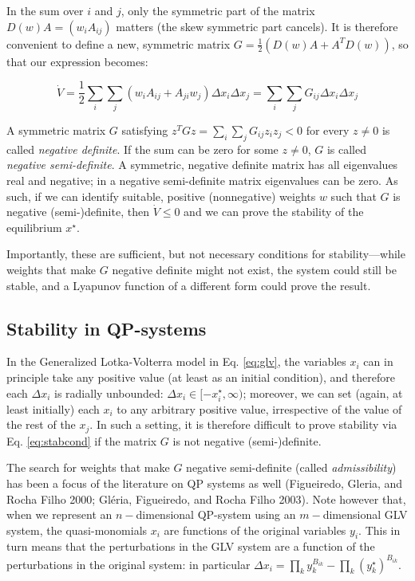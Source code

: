 \documentclass{article}
\begin{document}
In the sum over \(i\) and \(j\), only the symmetric part of the matrix
\(D(w) A = (w_i A_{ij})\) matters (the skew symmetric part cancels). It
is therefore convenient to define a new, symmetric matrix
\(G =\frac{1}{2} (D(w)A + A^T D(w))\), so that our expression becomes:

\begin{equation}
\label{eq:stabcond}
\dot{V} = \frac{1}{2}\sum_i \sum_j (w_i A_{ij} + A_{ji} w_j) \Delta x_i \Delta x_j = \sum_i \sum_j G_{ij} \Delta x_i \Delta x_j
\end{equation}

A symmetric matrix \(G\) satisfying
\(z^T G z = \sum_i \sum_j G_{ij} z_i z_j < 0\) for every \(z \neq 0\) is
called \emph{negative definite}. If the sum can be zero for some
\(z \neq 0\), \(G\) is called \emph{negative semi-definite}. A
symmetric, negative definite matrix has all eigenvalues real and
negative; in a negative semi-definite matrix eigenvalues can be zero. As
such, if we can identify suitable, positive (nonnegative) weights \(w\)
such that \(G\) is negative (semi-)definite, then \(\dot{V} \leq 0\) and
we can prove the stability of the equilibrium \(x^\star\).

Importantly, these are sufficient, but not necessary conditions for
stability---while weights that make \(G\) negative definite might not
exist, the system could still be stable, and a Lyapunov function of a
different form could prove the result.

\hypertarget{stability-in-qp-systems}{%
\subsection{Stability in QP-systems}\label{stability-in-qp-systems}}

In the Generalized Lotka-Volterra model in Eq. \ref{eq:glv}, the
variables \(x_i\) can in principle take any positive value (at least as
an initial condition), and therefore each \(\Delta x_i\) is radially
unbounded: \(\Delta x_i \in [-x_i^\star, \infty)\); moreover, we can set
(again, at least initially) each \(x_i\) to any arbitrary positive
value, irrespective of the value of the rest of the \(x_j\). In such a
setting, it is therefore difficult to prove stability via Eq.
\ref{eq:stabcond} if the matrix \(G\) is not negative (semi-)definite.

The search for weights that make \(G\) negative semi-definite (called
\emph{admissibility}) has been a focus of the literature on QP systems
as well (Figueiredo, Gleria, and Rocha Filho 2000; Gléria, Figueiredo,
and Rocha Filho 2003). Note however that, when we represent an
\(n-\)dimensional QP-system using an \(m-\)dimensional GLV system, the
quasi-monomials \(x_i\) are functions of the original variables \(y_i\).
This in turn means that the perturbations in the GLV system are a
function of the perturbations in the original system: in particular
\(\Delta x_i = \prod_{k} y_k^{B_{ik}} - \prod_{k} (y_k^\star)^{B_{ik}}\).
\end{document}
